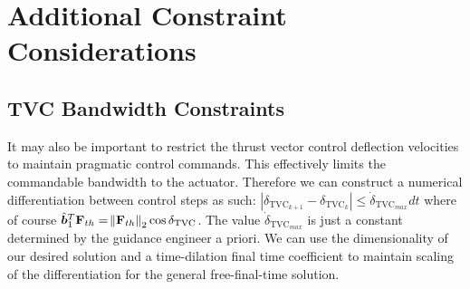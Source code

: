 \chapter{Additional Constraint Considerations}	%


\section{TVC Bandwidth Constraints}

It may also be important to restrict the thrust vector control deflection velocities to maintain pragmatic control commands. This effectively limits the commandable bandwidth to the actuator. Therefore we can construct a numerical differentiation between control steps as such: $|{\delta_{\text{TVC}_{k+1}} - \delta_{\text{TVC}_{k}}}| \leq \dot{\delta}_{\text{TVC}_{max}}dt$ where of course $\hat{\bm{b}}_1^T\mathbf{F}_{th} = \norm{\mathbf{F}_{th}}_2\cos{\delta_{\text{TVC}}}$. The value $\dot{\delta}_{\text{TVC}_{max}}$ is just a constant determined by the guidance engineer a priori. We can use the dimensionality of our desired solution and a time-dilation final time coefficient to maintain scaling of the differentiation for the general free-final-time solution.

